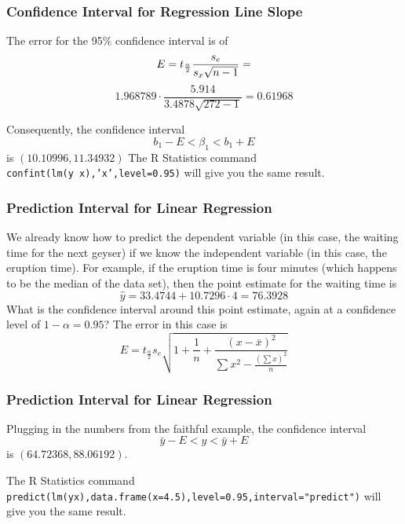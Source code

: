 \documentclass[xcolor=dvipsnames]{beamer}
\begin{document}
\begin{frame}
  \frametitle{Confidence Interval for Regression Line Slope}
  The error for the 95\% confidence interval is
  of 
\begin{equation}
  \label{eq:gaeyiegh}
E=t_{\frac{\alpha}{2}}\frac{s_{e}}{s_{x}\sqrt{n-1}}=\notag
\end{equation}
\begin{equation}
  \label{eq:eevievuo}
  1.968789\cdot\frac{5.914}{3.4878\sqrt{272-1}}=0.61968
\end{equation}

Consequently, the confidence interval
\begin{equation}
  \label{eq:sahshixu}
  b_{1}-E<\beta_{1}<b_{1}+E
\end{equation}
is $(10.10996,11.34932)$
The R Statistics command \texttt{confint(lm(y~x),'x',level=0.95)} will
give you the same result.
\end{frame}

\begin{frame}
  \frametitle{Prediction Interval for Linear Regression}
  We already know how to predict the dependent variable (in this case,
  the waiting time for the next geyser) if we know the independent
  variable (in this case, the eruption time). For example, if the
  eruption time is four minutes (which happens to be the median of the
  data set), then the point estimate for the waiting time is
  \begin{equation}
    \label{eq:thaejola}
    \hat{y}=33.4744+10.7296\cdot{}4=76.3928
  \end{equation}
What is the confidence interval around this point estimate, again at a
confidence level of $1-\alpha=0.95$? The error in this case is
\begin{equation}
  \label{eq:suquiequ}
  E=t_{\frac{\alpha}{2}}s_{e}\sqrt{1+\frac{1}{n}+\frac{(x-\bar{x})^{2}}{\sum{}x^{2}-\frac{\left(\sum{}x\right)^{2}}{n}}}
\end{equation}
\end{frame}

\begin{frame}
  \frametitle{Prediction Interval for Linear Regression}
  Plugging in the numbers from the faithful example, the confidence
  interval
  \begin{equation}
    \label{eq:miiniphu}
    \bar{y}-E<y<\bar{y}+E
  \end{equation}
  is $(64.72368,88.06192)$.

  \bigskip

  The R Statistics command \texttt{predict(lm(y{\texttildelow}x),data.frame(x=4.5),level=0.95,interval="predict")}
  will give you the same result.
\end{frame}
\end{document}
